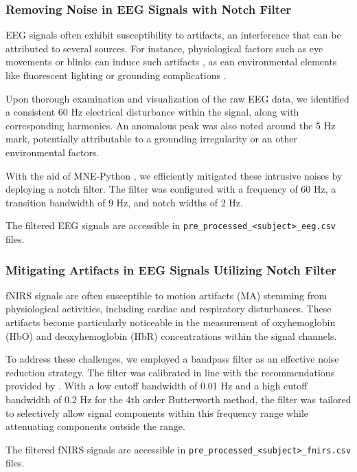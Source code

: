 \subsubsection{Removing Noise in EEG Signals with Notch Filter}

EEG signals often exhibit susceptibility to artifacts, an interference that can
be attributed to several sources. For instance, physiological factors such as
eye movements or blinks can induce such artifacts
\cite{10.3389/fnhum.2012.00278}, as can environmental elements like fluorescent
lighting or grounding complications \cite{Kaya21}.

Upon thorough examination and visualization of the raw EEG data, we identified
a consistent 60 Hz electrical disturbance within the signal, along with
corresponding harmonics. An anomalous peak was also noted around the 5 Hz mark,
potentially attributable to a grounding irregularity or an other environmental
factors.

With the aid of MNE-Python \cite{GramfortEtAl2013a}, we efficiently mitigated
these intrusive noises by deploying a notch filter. The filter was configured
with a frequency of 60 Hz, a transition bandwidth of 9 Hz, and notch widths of
2 Hz.

The filtered EEG signals are accessible in \texttt{pre\_processed\_<subject>\_eeg.csv} files.

\subsubsection{Mitigating Artifacts in EEG Signals Utilizing Notch Filter}

fNIRS signals are often susceptible to motion artifacts (MA) stemming from
physiological activities, including cardiac and respiratory disturbances. These
artifacts become particularly noticeable in the measurement of oxyhemoglobin
(HbO) and deoxyhemoglobin (HbR) concentrations within the signal channels.

To address these challenges, we employed a bandpass filter as an effective
noise reduction strategy. The filter was calibrated in line with the
recommendations provided by \cite{Koenraadt2014}. With a low cutoff bandwidth
of 0.01 Hz and a high cutoff bandwidth of 0.2 Hz for the 4th order Butterworth
method, the filter was tailored to selectively allow signal components within
this frequency range while attenuating components outside the range.

The filtered fNIRS signals are accessible in
\texttt{pre\_processed\_<subject>\_fnirs.csv} files.

